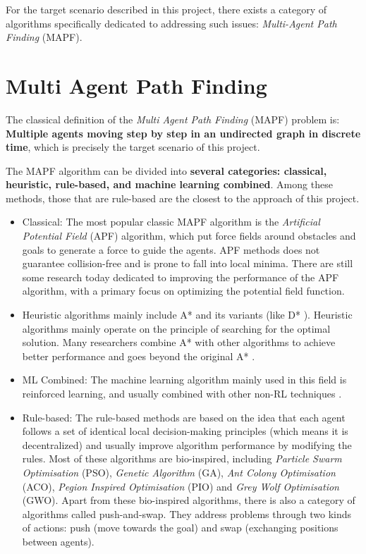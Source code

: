 For the target scenario described in this project, there exists a category of algorithms specifically dedicated to addressing such issues: \textit{Multi-Agent Path Finding} (MAPF).


\section{Multi Agent Path Finding}
The classical definition of the \textit{Multi Agent Path Finding} (MAPF) problem is: \textbf{Multiple agents moving step by step in an undirected graph in discrete time}\cite{MAPF_Review1}, which is precisely the target scenario of this project.

The MAPF algorithm can be divided into \textbf{several categories: classical, heuristic, rule-based, and machine learning combined}. 
Among these methods, those that are rule-based are the closest to the approach of this project.

\begin{itemize}
  \item Classical: The most popular classic MAPF algorithm is the \textit{Artificial Potential Field} (APF) algorithm, which put force fields around obstacles and goals to generate a force to guide the agents. APF methods does not guarantee collision-free and is prone to fall into local minima. There are still some research today dedicated to improving the performance of the APF algorithm, with a primary focus on optimizing the potential field function\cite{APF_improv2,APF_improv3,APF_improv4}.
  \item Heuristic algorithms mainly include A* and its variants (like  D* \cite{D*}). Heuristic algorithms mainly operate on the principle of searching for the optimal solution. Many researchers combine A* with other algorithms to achieve better performance and goes beyond the original A* \cite{A*_1,A*_2}.
  \item ML Combined: The machine learning algorithm mainly used in this field is reinforced learning, and usually combined with other non-RL techniques \cite{RL_1,RL_2,RL_3,RL_4}.
  \item Rule-based:  The rule-based methods are based on the idea that each agent follows a set of identical local decision-making principles (which means it is decentralized) and usually improve algorithm performance by modifying the rules. Most of these algorithms are bio-inspired, including \textit{Particle Swarm Optimisation} (PSO)\cite{PSO_1,PSO_2}, \textit{Genetic Algorithm} (GA)\cite{GA_1,GA_2}, \textit{Ant Colony Optimisation} (ACO)\cite{AGO_1,AGO_2}, \textit{Pegion Inspired Optimisation} (PIO)\cite{PIO_1, PIO_2} and \textit{Grey Wolf Optimisation} (GWO)\cite{GWO,GWO_1,GWO_2}. 
  Apart from these bio-inspired algorithms, there is also a category of algorithms called push-and-swap\cite{PaS_1, PaS_2}. They address problems through two kinds of actions: push (move towards the goal) and swap (exchanging positions between agents).
\end{itemize}

